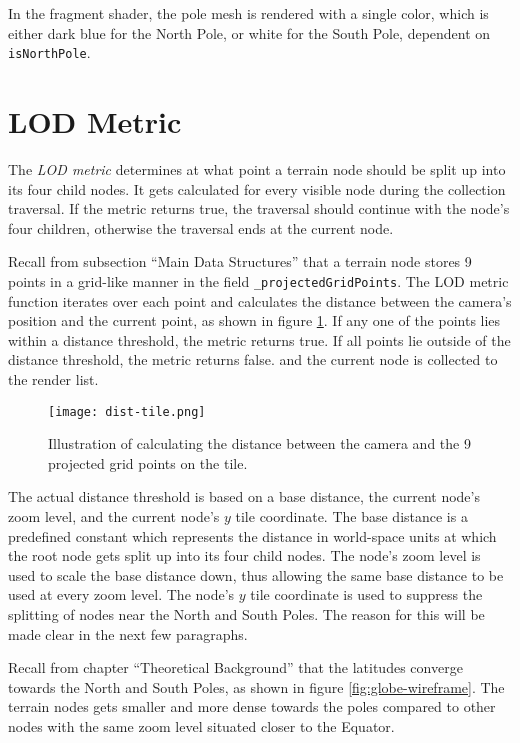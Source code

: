 In the fragment shader, the pole mesh is rendered with a single color, which is either dark blue 
for the North Pole, or white for the South Pole, dependent on \texttt{isNorthPole}.

\section{LOD Metric}
The \textit{LOD metric} determines at what point a terrain node should be split up into its four child nodes.
It gets calculated for every visible node during the collection traversal.
If the metric returns true, the traversal should continue 
with the node's four children, otherwise the traversal ends at the current node.

Recall from subsection ``Main Data Structures'' 
that a terrain node stores 9 points in a grid-like manner in the field \texttt{\_projectedGridPoints}.
The LOD metric function iterates over each point and calculates the distance 
between the camera's position and the current point, as shown in figure \ref{fig:dist-tile}.
If any one of the points lies within a distance threshold, the metric returns true.
If all points lie outside of the distance threshold, the metric returns false.
and the current node is collected to the render list.

\begin{figure}[H]
  \centering
  \texttt{[image: dist-tile.png]}
  \caption{Illustration of calculating the distance between the camera and the 9 projected grid points on the tile.}\label{fig:dist-tile}
\end{figure}

The actual distance threshold is based on a base distance, the current node's zoom level,
and the current node's $y$ tile coordinate. 
The base distance is a predefined constant which represents the distance in world-space units
at which the root node gets split up into its four child nodes.
The node's zoom level is used to scale the base distance down, thus allowing 
the same base distance to be used at every zoom level.
The node's $y$ tile coordinate is used to suppress the splitting of nodes near the North and South Poles.
The reason for this will be made clear in the next few paragraphs.

Recall from chapter ``Theoretical Background'' that the 
latitudes converge towards the North and South Poles, as shown in figure \ref{fig:globe-wireframe}.
The terrain nodes gets smaller and more dense towards the poles compared to other nodes 
with the same zoom level situated closer to the Equator.

